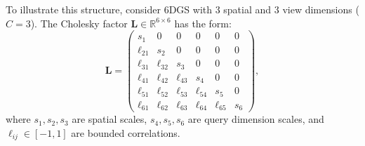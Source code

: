 \documentclass{article}
\theoremstyle{plain}
\theoremstyle{definition}
\theoremstyle{remark}
\begin{document}
To illustrate this structure, consider 6DGS with 3 spatial and 3 view dimensions ($C=3$). The Cholesky factor $\mathbf{L} \in \mathbb{R}^{6 \times 6}$ has the form:
\begin{equation}
\mathbf{L} = \left(\begin{array}{rrrrrr}
       s_1 &        0 &        0 &        0 &        0 &        0 \\
\ell_{21} &       s_2 &        0 &        0 &        0 &        0 \\
\ell_{31} & \ell_{32} &       s_3 &        0 &        0 &        0 \\
\ell_{41} & \ell_{42} & \ell_{43} &       s_4 &        0 &        0 \\
\ell_{51} & \ell_{52} & \ell_{53} & \ell_{54} &       s_5 &        0 \\
\ell_{61} & \ell_{62} & \ell_{63} & \ell_{64} & \ell_{65} &       s_6
\end{array}\right),
\end{equation}
where $s_1, s_2, s_3$ are spatial scales, $s_4, s_5, s_6$ are query dimension scales, and $\ell_{ij} \in [-1,1]$ are bounded correlations.

\end{document}
